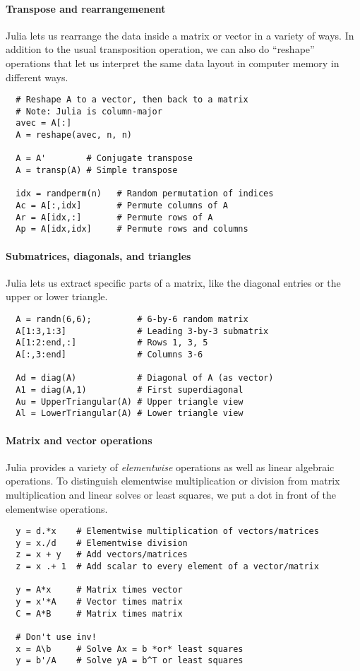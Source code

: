\documentclass[12pt, leqno]{article}
\begin{document}
\paragraph{Transpose and rearrangemenent}
Julia lets us rearrange the data inside a matrix or vector in
a variety of ways.  In addition to the usual transposition
operation, we can also do ``reshape'' operations that let us
interpret the same data layout in computer memory in different ways.
\begin{lstlisting}
  # Reshape A to a vector, then back to a matrix
  # Note: Julia is column-major
  avec = A[:]
  A = reshape(avec, n, n)
  
  A = A'        # Conjugate transpose
  A = transp(A) # Simple transpose

  idx = randperm(n)   # Random permutation of indices
  Ac = A[:,idx]       # Permute columns of A
  Ar = A[idx,:]       # Permute rows of A
  Ap = A[idx,idx]     # Permute rows and columns
\end{lstlisting}

\paragraph{Submatrices, diagonals, and triangles}
Julia lets us extract specific parts of a matrix, like the diagonal
entries or the upper or lower triangle.
\begin{lstlisting}
  A = randn(6,6);         # 6-by-6 random matrix
  A[1:3,1:3]              # Leading 3-by-3 submatrix
  A[1:2:end,:]            # Rows 1, 3, 5
  A[:,3:end]              # Columns 3-6
  
  Ad = diag(A)            # Diagonal of A (as vector)
  A1 = diag(A,1)          # First superdiagonal
  Au = UpperTriangular(A) # Upper triangle view
  Al = LowerTriangular(A) # Lower triangle view
\end{lstlisting}

\paragraph{Matrix and vector operations}
Julia provides a variety of {\em elementwise} operations as well as
linear algebraic operations.  To distinguish elementwise
multiplication or division from matrix multiplication and linear
solves or least squares, we put a dot in front of the elementwise
operations.
\begin{lstlisting}
  y = d.*x    # Elementwise multiplication of vectors/matrices
  y = x./d    # Elementwise division
  z = x + y   # Add vectors/matrices
  z = x .+ 1  # Add scalar to every element of a vector/matrix
  
  y = A*x     # Matrix times vector
  y = x'*A    # Vector times matrix
  C = A*B     # Matrix times matrix

  # Don't use inv!
  x = A\b     # Solve Ax = b *or* least squares
  y = b'/A    # Solve yA = b^T or least squares
\end{lstlisting}
\end{document}
